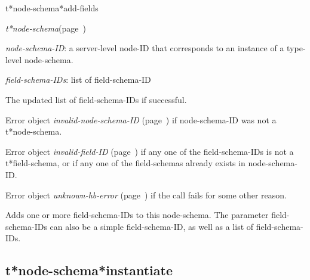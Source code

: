 \begin{description}
\item [Name:]  t*node-schema*add-fields

\item [Class:] {\sl t*node-schema}\hfill(page~\pageref{t*node-schema})

\item [Parameters:]
\item {\sl node-schema-ID}:  a server-level node-ID that corresponds to an 
instance of a type-level node-schema. 


\item {\sl field-schema-IDs}:  list of field-schema-ID


\item [Return-value:] 
The updated list of field-schema-IDs if successful.

Error object {\sl invalid-node-schema-ID} (page~\pageref{invalid-node-schema-ID}) if 
node-schema-ID was not a t*node-schema.

Error object {\sl invalid-field-ID} (page~\pageref{invalid-field-ID}) if any one of the 
field-schema-IDs is not a t*field-schema, or if any
one of the field-schemas already exists in node-schema-ID.

Error object {\sl unknown-hb-error} (page~\pageref{unknown-hb-error}) if the call 
fails for some other reason. 

\item [Description:]  Adds one or more field-schema-IDs to 
this node-schema. The parameter field-schema-IDs
can also be a simple field-schema-ID, as well as
a list of field-schema-IDs.

\item [Public:]



\end{description}
\horizontalline

\subsection{t*node-schema*instantiate}
\label{t*node-schema*instantiate}

